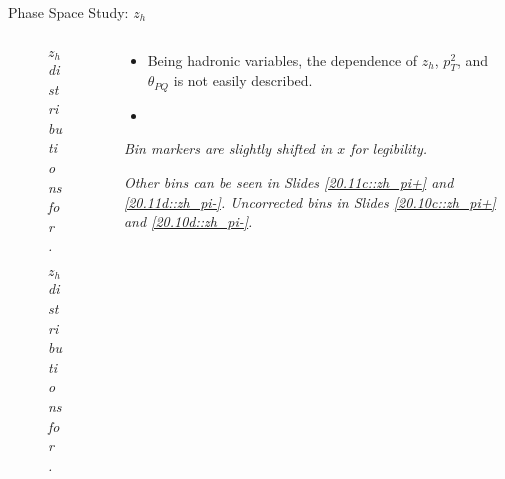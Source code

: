 \begin{frame}{Phase Space Study: $z_h$}
    \label{12.14::zh}

    \begin{columns}[onlytextwidth,T]

    \begin{column}{.44\linewidth}
        \vspace{-15pt}
        \begin{center}
            \begin{figure}[t]
                \scriptsize{\textit{$z_h$ distributions for \ef{$\pi^-$}.}}
            \end{figure}

            \vspace{-9pt}
            \begin{figure}[t]
                \scriptsize{\textit{$z_h$ distributions for \ef{$\pi^+$}.}}
            \end{figure}
        \end{center}
    \end{column}

    \begin{column}{.54\linewidth}
        \begin{itemize}
            \item
                Being hadronic variables, the \ef{$\theta$} dependence of $z_h$, $p_T^2$, and $\theta_{PQ}$ is not easily described.

            \vspace{12pt}
            \item
        \end{itemize}

        \vspace{105pt}

        \begin{flushright}
            \tiny{\textit{Bin markers are slightly shifted in $x$ for legibility.}}

            \tiny{\textit{
                Other bins can be seen in Slides \textcolor{efd_purple}{\ref{20.11c::zh_pi+}} and \textcolor{efd_purple}{\ref{20.11d::zh_pi-}}.
                Uncorrected bins in Slides \textcolor{efd_purple}{\ref{20.10c::zh_pi+}} and \textcolor{efd_purple}{\ref{20.10d::zh_pi-}}.
            }}
        \end{flushright}
    \end{column}

    \end{columns}
\end{frame}

